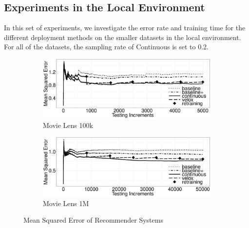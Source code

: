 \documentclass{vldb}
\begin{document}
\subsection{Experiments in the Local Environment}\label{subsec:experiment-local}
In this set of experiments, we investigate the error rate and training time for the different deployment methods on the smaller datasets in the local environment.
For all of the datasets, the sampling rate of Continuous is set to 0.2.

\begin{figure}[h]
\begin{subfigure}{\columnwidth}
	\includegraphics[width=\columnwidth]{../images/experiment-results/movie-lens-100k-quality-improved.eps}
	\caption{Movie Lens 100k}
	\label{fig:movie-lens-100k-score}
\end{subfigure}
\begin{subfigure}{\columnwidth}
  \includegraphics[width=\columnwidth]{../images/experiment-results/movie-lens-1m-quality-improved.eps}
\caption{Movie Lens 1M}
\label{fig:movie-lens-1M-score}
\end{subfigure}
\vspace{2mm}
\caption{Mean Squared Error of Recommender Systems}
\end{figure}
\end{document}
